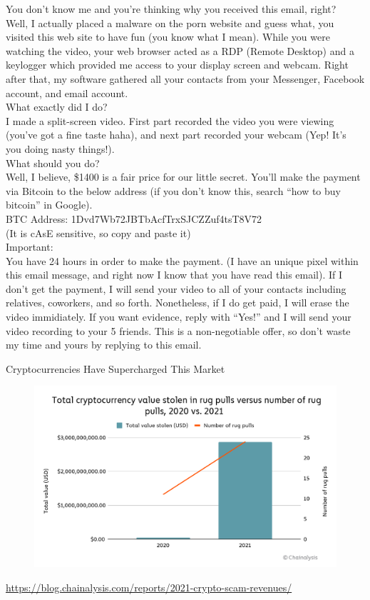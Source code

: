 \documentclass[nobackground,dvipsnames,table]{beamer}
\begin{document}
\begin{frame}{}%
    \thispagestyle{empty}
    \footnotesize
    You don’t know me and you’re thinking why you received this email, right?\\
    Well, I actually placed a malware on the porn website and guess what, you visited this web site to have fun (you know what I mean). While you were watching the video, your web browser acted as a RDP (Remote Desktop) and a keylogger which provided me access to your display screen and webcam. Right after that, my software gathered all your contacts from your Messenger, Facebook account, and email account.\\
    What exactly did I do?\\
    I made a split-screen video. First part recorded the video you were viewing (you’ve got a fine taste haha), and next part recorded your webcam (Yep! It’s you doing nasty things!).\\
    What should you do?\\
    Well, I believe, \$1400 is a fair price for our little secret. You’ll make the payment via Bitcoin to the below address (if you don’t know this, search “how to buy bitcoin” in Google).\\
    BTC Address: 1Dvd7Wb72JBTbAcfTrxSJCZZuf4tsT8V72\\
    (It is cAsE sensitive, so copy and paste it)\\
    Important:\\
    You have 24 hours in order to make the payment. (I have an unique pixel within this email message, and right now I know that you have read this email). If I don’t get the payment, I will send your video to all of your contacts including relatives, coworkers, and so forth. Nonetheless, if I do get paid, I will erase the video immidiately. If you want evidence, reply with “Yes!” and I will send your video recording to your 5 friends. This is a non-negotiable offer, so don’t waste my time and yours by replying to this email.
\end{frame}

\begin{frame}{Cryptocurrencies Have Supercharged This Market}
    \begin{figure}
        \centering
        \includegraphics[width=\textwidth]{rug-pulls}
    \end{figure}
    \url{https://blog.chainalysis.com/reports/2021-crypto-scam-revenues/}
\end{frame}
\end{document}
